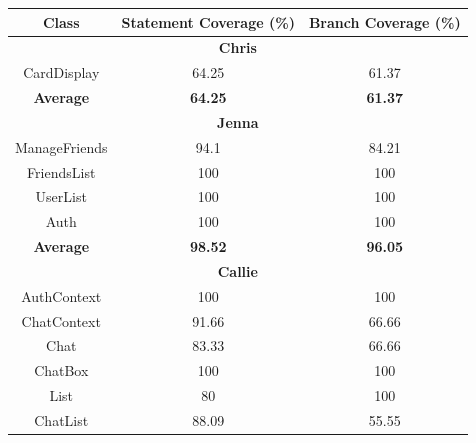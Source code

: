 \begin{table}[!hbt]
\begin{tabular}{|ccc|}
\hline
\multicolumn{1}{|c|}{\textbf{Class}} & \multicolumn{1}{c|}{\textbf{Statement Coverage (\%)}} & \textbf{Branch Coverage (\%)} \\ \hline
\multicolumn{3}{|c|}{\textbf{Chris}}                                                          \\ \hline
\multicolumn{1}{|c|}{CardDisplay}      & \multicolumn{1}{c|}{64.25}          & 61.37          \\ \hline
\multicolumn{1}{|c|}{\textbf{Average}} & \multicolumn{1}{c|}{\textbf{64.25}} & \textbf{61.37} \\ \hline
\multicolumn{3}{|c|}{\textbf{Jenna}}                                                          \\ \hline
\multicolumn{1}{|c|}{ManageFriends}    & \multicolumn{1}{c|}{94.1}           & 84.21          \\ \hline
\multicolumn{1}{|c|}{FriendsList}      & \multicolumn{1}{c|}{100}            & 100            \\ \hline
\multicolumn{1}{|c|}{UserList}         & \multicolumn{1}{c|}{100}            & 100            \\ \hline
\multicolumn{1}{|c|}{Auth}             & \multicolumn{1}{c|}{100}            & 100            \\ \hline
\multicolumn{1}{|c|}{\textbf{Average}} & \multicolumn{1}{c|}{\textbf{98.52}} & \textbf{96.05} \\ \hline
\multicolumn{3}{|c|}{\textbf{Callie}}                                                         \\ \hline
\multicolumn{1}{|c|}{AuthContext}      & \multicolumn{1}{c|}{100}            & 100            \\ \hline
\multicolumn{1}{|c|}{ChatContext}      & \multicolumn{1}{c|}{91.66}          & 66.66          \\ \hline
\multicolumn{1}{|c|}{Chat}             & \multicolumn{1}{c|}{83.33}          & 66.66          \\ \hline
\multicolumn{1}{|c|}{ChatBox}          & \multicolumn{1}{c|}{100}            & 100            \\ \hline
\multicolumn{1}{|c|}{List}             & \multicolumn{1}{c|}{80}             & 100            \\ \hline
\multicolumn{1}{|c|}{ChatList}         & \multicolumn{1}{c|}{88.09}          & 55.55          \\ \hline

\end{tabular}
\end{table}
